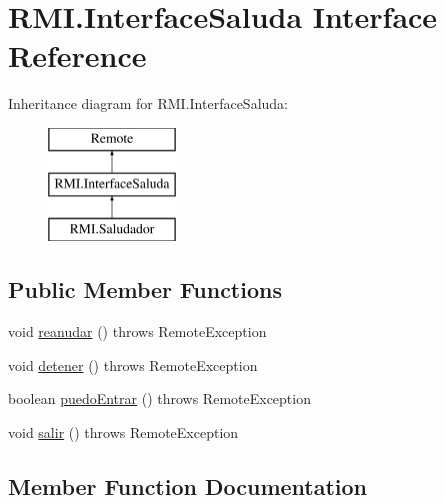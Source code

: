 \hypertarget{interface_r_m_i_1_1_interface_saluda}{}\section{R\+M\+I.\+Interface\+Saluda Interface Reference}
\label{interface_r_m_i_1_1_interface_saluda}
Inheritance diagram for R\+M\+I.\+Interface\+Saluda\+:\begin{figure}[H]
\begin{center}
\leavevmode
\includegraphics[height=3.000000cm]{interface_r_m_i_1_1_interface_saluda}
\end{center}
\end{figure}
\subsection*{Public Member Functions}
\begin{DoxyCompactItemize}
\item 
void \mbox{\hyperlink{interface_r_m_i_1_1_interface_saluda_a8d97c9155ed6c35d8691263d1b70000a}{reanudar}} ()  throws Remote\+Exception
\item 
void \mbox{\hyperlink{interface_r_m_i_1_1_interface_saluda_a271848a330c374eb0f6f5157cc2b60c6}{detener}} ()  throws Remote\+Exception
\item 
boolean \mbox{\hyperlink{interface_r_m_i_1_1_interface_saluda_afbc3db469b848c5a90bbf10ebc20823f}{puedo\+Entrar}} ()  throws Remote\+Exception
\item 
void \mbox{\hyperlink{interface_r_m_i_1_1_interface_saluda_a9bfad049387b9c751039d6c796f30db6}{salir}} ()  throws Remote\+Exception
\end{DoxyCompactItemize}


\subsection{Member Function Documentation}
\mbox{\label{interface_r_m_i_1_1_interface_saluda_a271848a330c374eb0f6f5157cc2b60c6}} 
